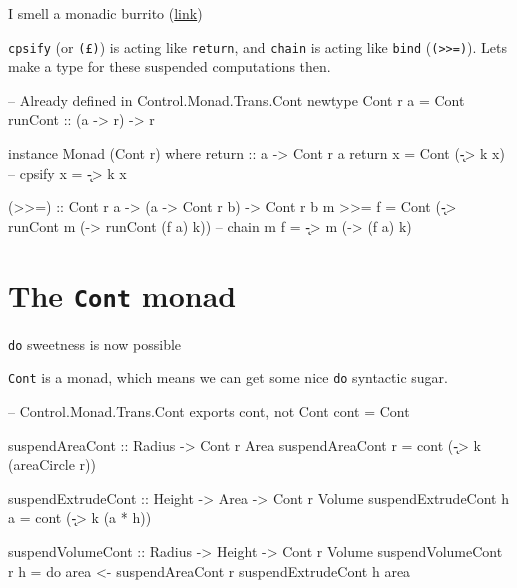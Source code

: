 \documentclass[ignorenonframetext,]{beamer}
\begin{document}
\begin{frame}[fragile]{I smell a monadic burrito
(\href{http://blog.plover.com/prog/burritos.html}{link})}

\texttt{cpsify} (or \texttt{(£)}) is acting like \texttt{return}, and
\texttt{chain} is acting like \texttt{bind}
(\texttt{(\textgreater{}\textgreater{}=)}). Lets make a type for these
suspended computations then.

\begin{haskellcode}
-- Already defined in Control.Monad.Trans.Cont
newtype Cont r a = Cont {runCont :: (a -> r) -> r}
\end{haskellcode}

\pause

\begin{haskellcode}
instance Monad (Cont r) where
    return :: a -> Cont r a
    return x = Cont (\k -> k x)
 -- cpsify x =       \k -> k x
\end{haskellcode}

\pause

\begin{haskellcode}
    (>>=) :: Cont r a -> (a -> Cont r b) -> Cont r b
    m >>= f = Cont
        (\k -> runCont m (\a -> runCont (f a) k))
 -- chain m f = \k ->  m (\a ->         (f a) k)
\end{haskellcode}

\end{frame}

\section{The \texttt{Cont} monad}\label{the-cont-monad}

\begin{frame}[fragile]{\texttt{do} sweetness is now possible}

\texttt{Cont} is a monad, which means we can get some nice \texttt{do}
syntactic sugar.

\begin{haskellcode}
-- Control.Monad.Trans.Cont exports cont, not Cont
cont = Cont
\end{haskellcode}

\begin{haskellcode}
suspendAreaCont :: Radius -> Cont r Area
suspendAreaCont r = cont (\k -> k (areaCircle r))

suspendExtrudeCont :: Height -> Area -> Cont r Volume
suspendExtrudeCont h a = cont (\k -> k (a * h))

suspendVolumeCont :: Radius -> Height -> Cont r Volume
suspendVolumeCont r h = do
  area <- suspendAreaCont r
  suspendExtrudeCont h area
\end{haskellcode}

\end{frame}
\end{document}
